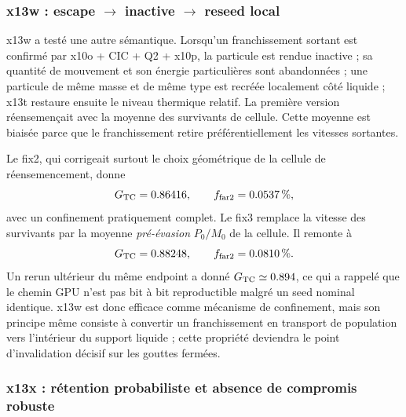 \documentclass[11pt,a4paper]{article}
\begin{document}
\subsubsection{x13w : escape $\rightarrow$ inactive $\rightarrow$ reseed local}

x13w a testé une autre sémantique. Lorsqu'un franchissement sortant est confirmé par x10o + CIC + Q2 + x10p, la particule est rendue inactive ; sa quantité de mouvement et son énergie particulières sont abandonnées ; une particule de même masse et de même type est recréée localement côté liquide ; x13t restaure ensuite le niveau thermique relatif. La première version réensemençait avec la moyenne des survivants de cellule. Cette moyenne est biaisée parce que le franchissement retire préférentiellement les vitesses sortantes.

Le fix2, qui corrigeait surtout le choix géométrique de la cellule de réensemencement, donne
\begin{equation}
 G_{\rm TC}=0.86416,
 \qquad
 f_{\rm far2}=0.0537\,\%,
\end{equation}
avec un confinement pratiquement complet. Le fix3 remplace la vitesse des survivants par la moyenne \emph{pré-évasion} $P_0/M_0$ de la cellule. Il remonte à
\begin{equation}
 G_{\rm TC}=0.88248,
 \qquad
 f_{\rm far2}=0.0810\,\%.
\end{equation}
Un rerun ultérieur du même endpoint a donné $G_{\rm TC}\simeq0.894$, ce qui a rappelé que le chemin GPU n'est pas bit à bit reproductible malgré un seed nominal identique. x13w est donc efficace comme mécanisme de confinement, mais son principe même consiste à convertir un franchissement en transport de population vers l'intérieur du support liquide ; cette propriété deviendra le point d'invalidation décisif sur les gouttes fermées.

\subsubsection{x13x : rétention probabiliste et absence de compromis robuste}
\end{document}
